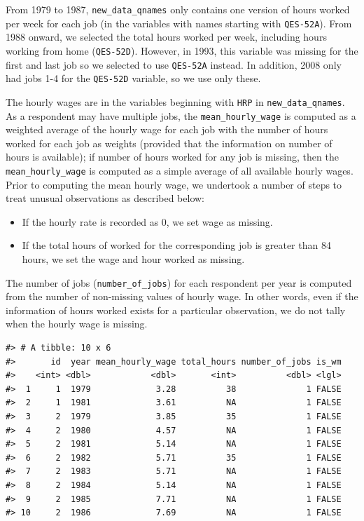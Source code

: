 \documentclass{article}
\begin{document}
From 1979 to 1987, \texttt{new\_data\_qnames} only contains one version of hours worked per week for each job (in the variables with names starting with \texttt{QES-52A}). From 1988 onward, we selected the total hours worked per week, including hours working from home (\texttt{QES-52D}). However, in 1993, this variable was missing for the first and last job so we selected to use \texttt{QES-52A} instead. In addition, 2008 only had jobs 1-4 for the \texttt{QES-52D} variable, so we use only these.

The hourly wages are in the variables beginning with \texttt{HRP} in \texttt{new\_data\_qnames}. As a respondent may have multiple jobs, the \texttt{mean\_hourly\_wage} is computed as a weighted average of the hourly wage for each job with the number of hours worked for each job as weights (provided that the information on number of hours is available); if number of hours worked for any job is missing, then the \texttt{mean\_hourly\_wage} is computed as a simple average of all available hourly wages. Prior to computing the mean hourly wage, we undertook a number of steps to treat unusual observations as described below:

\begin{itemize}
\tightlist
\item
  If the hourly rate is recorded as 0, we set wage as missing.
\item
  If the total hours of worked for the corresponding job is greater than 84 hours, we set the wage and hour worked as missing.
\end{itemize}

The number of jobs (\texttt{number\_of\_jobs}) for each respondent per year is computed from the number of non-missing values of hourly wage. In other words, even if the information of hours worked exists for a particular observation, we do not tally when the hourly wage is missing.

\begin{verbatim}
#> # A tibble: 10 x 6
#>       id  year mean_hourly_wage total_hours number_of_jobs is_wm
#>    <int> <dbl>            <dbl>       <int>          <dbl> <lgl>
#>  1     1  1979             3.28          38              1 FALSE
#>  2     1  1981             3.61          NA              1 FALSE
#>  3     2  1979             3.85          35              1 FALSE
#>  4     2  1980             4.57          NA              1 FALSE
#>  5     2  1981             5.14          NA              1 FALSE
#>  6     2  1982             5.71          35              1 FALSE
#>  7     2  1983             5.71          NA              1 FALSE
#>  8     2  1984             5.14          NA              1 FALSE
#>  9     2  1985             7.71          NA              1 FALSE
#> 10     2  1986             7.69          NA              1 FALSE
\end{verbatim}
\end{document}
